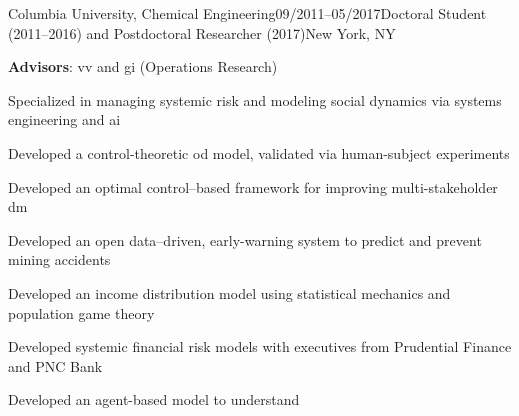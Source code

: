 
\begin{rSubsection}{Columbia University, Chemical Engineering}{09/2011--05/2017}{Doctoral Student (2011--2016) and Postdoctoral Researcher (2017)}{New York, NY}
\item {\bf Advisors}: \gls{vv} and \gls{gi} (Operations Research)
\smallskip
\item Specialized in managing systemic risk and
modeling social dynamics %
via systems engineering and \gls{ai} %
\item %
Developed a control-theoretic %
\gls{od} model, %
validated via human-subject experiments
\item Developed an 
optimal control--based %
framework for %
improving multi-stakeholder %
\gls{dm}
\item Developed an open data--driven, %
early-warning system to predict and prevent mining accidents 
\item Developed an %
income distribution model
using 
statistical mechanics and population game theory %
\item %
Developed systemic financial risk models
with %
executives %
from Prudential Finance and PNC Bank
\item Developed %
an agent-based model to understand 

\end{rSubsection}
